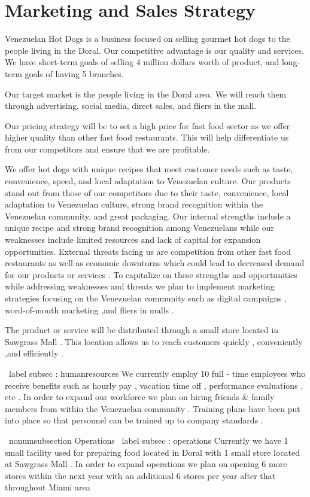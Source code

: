  

\section{Marketing and Sales Strategy}\label{sec:marketing}
\label{subsec:executive}
Venezuelan Hot Dogs is a business focused on selling gourmet hot dogs to the people living in the Doral. Our competitive advantage is our quality and services. We have short-term goals of selling 4 million dollars worth of product, and long-term goals of having 5 branches. 

\label{subsec:target}
Our target market is the people living in the Doral area. We will reach them through advertising, social media, direct sales, and fliers in the mall. 

\label{subsec:pricing}
Our pricing strategy will be to set a high price for fast food sector as we offer higher quality than other fast food restaurants. This will help differentiate us from our competitors and ensure that we are profitable. 

\label{subsec:product} 
We offer hot dogs with unique recipes that meet customer needs such as taste, convenience, speed, and local adaptation to Venezuelan culture. Our products stand out from those of our competitors due to their taste, convenience, local adaptation to Venezuelan culture, strong brand recognition within the Venezuelan community, and great packaging. Our internal strengths include a unique recipe and strong brand recognition among Venezuelans while our weaknesses include limited resources and lack of capital for expansion opportunities. External threats facing us are competition from other fast food restaurants as well as economic downturns which could lead to decreased demand for our products or services . To capitalize on these strengths and opportunities while addressing weaknesses and threats we plan to implement marketing strategies focusing on the Venezuelan community such as digital campaigns , word-of-mouth marketing ,and fliers in malls . 

 \label {subsec :distribution }   The product or service will be distributed through a small store located in Sawgrass Mall . This location allows us to reach customers quickly , conveniently ,and efficiently .  

  \ label { subsec : humanresources }    We currently employ 10 full - time employees who receive benefits such as hourly pay , vacation time off , performance evaluations , etc . In order to expand our workforce we plan on hiring friends & family members from within the Venezuelan community . Training plans have been put into place so that personnel can be trained up to company standards .   

 \ nonumsubsection {Operations } \ label { subsec : operations }     Currently we have 1 small facility used for preparing food located in Doral with 1 small store located at Sawgrass Mall . In order to expand operations we plan on opening 6 more stores within the next year with an additional 6 stores per year after that throughout Miami area